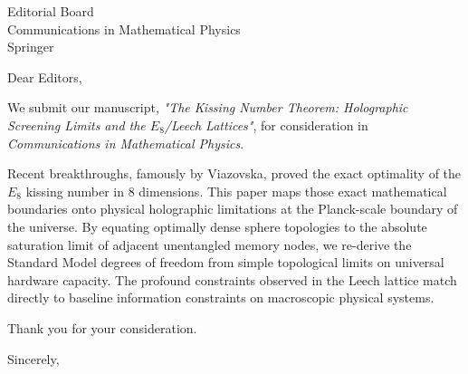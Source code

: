 \documentclass[11pt]{letter}
\begin{document}
\begin{letter}{Editorial Board \\ Communications in Mathematical Physics \\ Springer}
\opening{Dear Editors,}

We submit our manuscript, \textit{"The Kissing Number Theorem: Holographic Screening Limits and the $E_8$/Leech Lattices"}, for consideration in \textit{Communications in Mathematical Physics}.

Recent breakthroughs, famously by Viazovska, proved the exact optimality of the $E_8$ kissing number in 8 dimensions. This paper maps those exact mathematical boundaries onto physical holographic limitations at the Planck-scale boundary of the universe. By equating optimally dense sphere topologies to the absolute saturation limit of adjacent unentangled memory nodes, we re-derive the Standard Model degrees of freedom from simple topological limits on universal hardware capacity. The profound constraints observed in the Leech lattice match directly to baseline information constraints on macroscopic physical systems.

Thank you for your consideration.

\closing{Sincerely,}

\end{letter}
\end{document}
